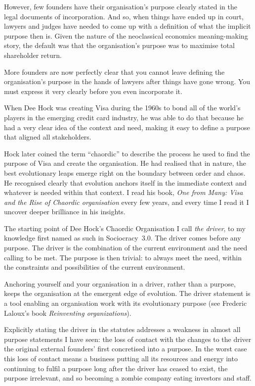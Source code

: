 However, few founders have their organisation’s purpose clearly stated in the legal documents of incorporation. And so, when things have ended up in court, lawyers and judges have needed to come up with a definition of what the implicit purpose then is. Given the nature of the neoclassical economics  meaning\hyp{}making story, the default was that the organisation’s purpose was to maximise total shareholder return.


More founders are now perfectly clear that you cannot leave defining the organisation’s purpose in the hands of lawyers after things have gone wrong. You must express it very clearly before you even incorporate it. 


When Dee Hock\cite{hock-one}  was creating Visa  during the 1960s to bond all of the world's players in the emerging credit card industry, he was able to do that because he had a very clear idea of the context and need, making it easy to define a purpose that aligned all stakeholders.


Hock later coined the term “chaordic”   to describe the process he used to find the purpose of Visa and create the organisation. He had realised that in nature, the best evolutionary leaps emerge right on the boundary between order and chaos. He recognised clearly that evolution anchors itself in the immediate context and whatever is needed within that context. I read his book, \emph{One from Many: Visa and the Rise of Chaordic organisation}\cite{hock-one} every few years, and every time I read it I uncover deeper brilliance in his insights.


The starting point of Dee Hock's Chaordic Organisation I call \emph{the driver}, to my knowledge first named as such in Sociocracy~3.0\cite{priest-s3-web}. The driver comes before any purpose. The driver is the combination of the current environment and the need calling to be met. The purpose is then trivial: to always meet the need, within the constraints and possibilities of the current environment. 


Anchoring yourself and your organisation in a driver, rather than a purpose, keeps the organisation at the emergent edge of evolution. The driver statement is a tool enabling an organisation work with its evolutionary purpose (see Frederic Laloux's book  \emph{Reinventing organizations}\cite{laloux-RO}).  


Explicitly stating the driver in the statutes addresses a weakness in almost all purpose statements I have seen: the loss of contact with the changes to the driver the original external founders' first concretised into a purpose. In the worst case this loss of contact means a business putting all its resources and energy into continuing to fulfil a purpose long after the driver has ceased to exist, the purpose irrelevant, and so becoming a zombie company  eating investors and staff.


